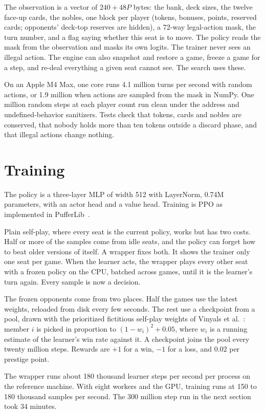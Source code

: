 \documentclass[11pt]{article}
\begin{document}
The observation is a vector of $240 + 48P$ bytes: the bank, deck sizes, the twelve face-up
cards, the nobles, one block per player (tokens, bonuses, points, reserved cards; opponents'
deck-top reserves are hidden), a 72-way legal-action mask, the turn number, and a flag saying
whether this seat is to move. The policy reads the mask from the observation and masks its
own logits. The trainer never sees an illegal action. The engine can also snapshot and
restore a game, freeze a game for a step, and re-deal everything a given seat cannot see. The
search uses these.

On an Apple M4 Max, one core runs 4.1 million turns per second with random actions, or 1.9
million when actions are sampled from the mask in NumPy. One million random steps at each
player count run clean under the address and undefined-behavior sanitizers. Tests check that
tokens, cards and nobles are conserved, that nobody holds more than ten tokens outside a
discard phase, and that illegal actions change nothing.

\section{Training}
The policy is a three-layer MLP of width 512 with LayerNorm, 0.74M parameters, with an actor
head and a value head. Training is PPO as implemented in PufferLib~\cite{suarez2024}.

Plain self-play, where every seat is the current policy, works but has two costs. Half or
more of the samples come from idle seats, and the policy can forget how to beat older
versions of itself. A wrapper fixes both. It shows the trainer only one seat per game. When
the learner acts, the wrapper plays every other seat with a frozen policy on the CPU, batched
across games, until it is the learner's turn again. Every sample is now a decision.

The frozen opponents come from two places. Half the games use the latest weights, reloaded
from disk every few seconds. The rest use a checkpoint from a pool, drawn with the
prioritized fictitious self-play weights of Vinyals et al.~\cite{vinyals2019}: member $i$ is
picked in proportion to $(1-w_i)^2 + 0.05$, where $w_i$ is a running estimate of the
learner's win rate against it. A checkpoint joins the pool every twenty million steps.
Rewards are $+1$ for a win, $-1$ for a loss, and $0.02$ per prestige point.

The wrapper runs about 180 thousand learner steps per second per process on the reference
machine. With eight workers and the GPU, training runs at 150 to 180 thousand samples per
second. The 300 million step run in the next section took 34 minutes.
\end{document}
